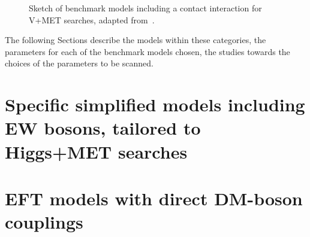 \begin{figure}[h!]
	\centering
	\vspace{\baselineskip}
	\textwidth
	\begin{feynmandiagram}[modelVeft5pt]
	\end{feynmandiagram}
	
	\vspace{\baselineskip}
	\caption{Sketch of benchmark models including a contact interaction
		for V+MET searches, adapted from~\cite{Nelson:2013pqa}. \label{fig:VPlusMET_EFT}}
\end{figure}

The following Sections describe the models within these categories,
the parameters for each of the benchmark models chosen,
the studies towards the choices of the parameters to be scanned.

\section{Specific simplified models including EW bosons, tailored to Higgs+MET searches}


\section{EFT models with direct DM-boson couplings}
\label{sec:EFT_models_with_direct_DM_boson_couplings}


